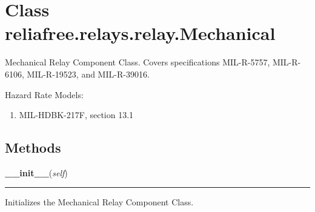 %
%
%


\section{Class reliafree.relays.relay.Mechanical}

    \label{reliafree:relays:relay:Mechanical}
Mechanical Relay Component Class. Covers specifications MIL-R-5757, 
MIL-R-6106, MIL-R-19523, and MIL-R-39016.

Hazard Rate Models:

\begin{enumerate}

\setlength{\parskip}{0.5ex}
  \item MIL-HDBK-217F, section 13.1

\end{enumerate}



  \subsection{Methods}

    \label{reliafree:relays:relay:Mechanical:__init__}

    \vspace{0.5ex}

\hspace{.8\funcindent}\begin{boxedminipage}{\funcwidth}

    \raggedright \textbf{\_\_init\_\_}(\textit{self})

    \vspace{-1.5ex}

    \rule{\textwidth}{0.5\fboxrule}
\setlength{\parskip}{2ex}
    Initializes the Mechanical Relay Component Class.

\setlength{\parskip}{1ex}
    \end{boxedminipage}

